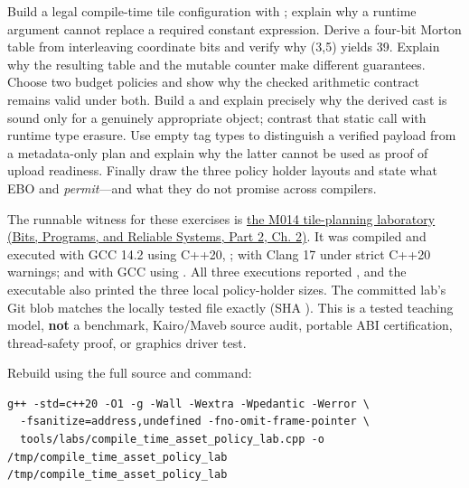 Build a legal compile-time tile configuration with ; explain why a runtime argument cannot replace a required constant expression. Derive a four-bit Morton table from interleaving coordinate bits and verify why (3,5) yields 39. Explain why the resulting  table and the  mutable counter make different guarantees. Choose two budget policies and show why the checked arithmetic contract remains valid under both. Build a  and explain precisely why the derived cast is sound only for a genuinely appropriate object; contrast that static call with runtime type erasure. Use empty tag types to distinguish a verified payload from a metadata-only plan and explain why the latter cannot be used as proof of upload readiness. Finally draw the three policy holder layouts and state what EBO and  \emph{permit}---and what they do not promise across compilers.

The runnable witness for these exercises is \href{../01-Bits-Programs-and-Reliable-Systems-P02/main.pdf\#nameddest=source-file-f5eb017280bb6b2ae6b1475d}{the M014 tile-planning laboratory (Bits, Programs, and Reliable Systems, Part 2, Ch. 2)}. It was compiled and executed with GCC 14.2 using C++20, ; with Clang 17 under strict C++20 warnings; and with GCC using . All three executions reported , and the executable also printed the three local policy-holder sizes. The committed lab's Git blob matches the locally tested file exactly (SHA ). This is a tested teaching model, \textbf{not} a benchmark, Kairo/Maveb source audit, portable ABI certification, thread-safety proof, or graphics driver test.

Rebuild using the full source and command:

\begin{verbatim}
g++ -std=c++20 -O1 -g -Wall -Wextra -Wpedantic -Werror \
  -fsanitize=address,undefined -fno-omit-frame-pointer \
  tools/labs/compile_time_asset_policy_lab.cpp -o /tmp/compile_time_asset_policy_lab
/tmp/compile_time_asset_policy_lab
\end{verbatim}

